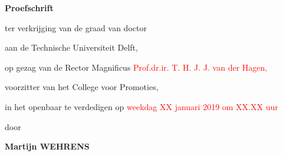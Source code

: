 \begin{titlepage}

%
%
%
%
%
%
%
%

\begin{center}


\vspace*{2\bigskipamount}

{\makeatletter
\titlestyle\bfseries\LARGE\@title
\makeatother}

{\makeatletter
\ifx\@subtitle\undefined\else
    \bigskip
    \titlefont\titleshape\Large\@subtitle
\fi
\makeatother}

\vfill


{\Large\titlefont\bfseries Proefschrift}

\bigskip
\bigskip

ter verkrijging van de graad van doctor

aan de Technische Universiteit Delft,

op gezag van de Rector Magnificus \textcolor{red}{Prof.dr.ir. T. H. J. J. van der Hagen,}

voorzitter van het College voor Promoties,

in het openbaar te verdedigen op \textcolor{red}{weekdag XX januari 2019 om XX.XX uur}

\bigskip
\bigskip

door

\bigskip
\bigskip

\makeatletter
{\Large\titlefont\bfseries Martijn WEHRENS}
\makeatother


\end{center}
\end{titlepage}
